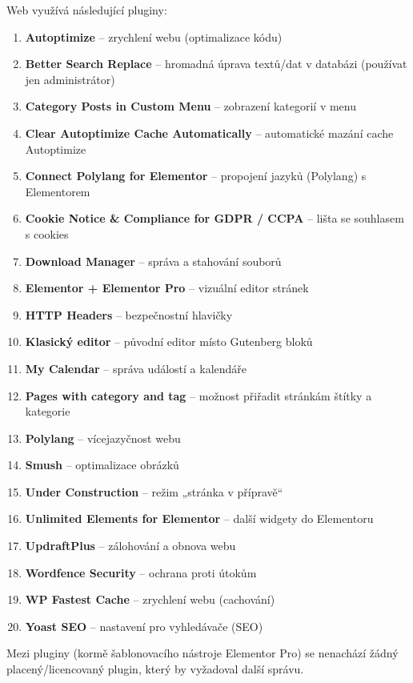 \documentclass[12pt,a4paper]{article}
\begin{document}
	Web využívá následující pluginy:
	\begin{enumerate}
		\item \textbf{Autoptimize} – zrychlení webu (optimalizace kódu)
		\item \textbf{Better Search Replace} – hromadná úprava textů/dat v databázi (používat jen administrátor)
		\item \textbf{Category Posts in Custom Menu} – zobrazení kategorií v menu
		\item \textbf{Clear Autoptimize Cache Automatically} – automatické mazání cache Autoptimize
		\item \textbf{Connect Polylang for Elementor} – propojení jazyků (Polylang) s Elementorem
		\item \textbf{Cookie Notice \& Compliance for GDPR / CCPA} – lišta se souhlasem s cookies
		\item \textbf{Download Manager} – správa a stahování souborů
		\item \textbf{Elementor + Elementor Pro} – vizuální editor stránek
		\item \textbf{HTTP Headers} – bezpečnostní hlavičky
		\item \textbf{Klasický editor} – původní editor místo Gutenberg bloků
		\item \textbf{My Calendar} – správa událostí a kalendáře
		\item \textbf{Pages with category and tag} – možnost přiřadit stránkám štítky a kategorie
		\item \textbf{Polylang} – vícejazyčnost webu
		\item \textbf{Smush} – optimalizace obrázků
		\item \textbf{Under Construction} – režim „stránka v přípravě“
		\item \textbf{Unlimited Elements for Elementor} – další widgety do Elementoru
		\item \textbf{UpdraftPlus} – zálohování a obnova webu
		\item \textbf{Wordfence Security} – ochrana proti útokům
		\item \textbf{WP Fastest Cache} – zrychlení webu (cachování)
		\item \textbf{Yoast SEO} – nastavení pro vyhledávače (SEO)
	\end{enumerate}
	
	Mezi pluginy (kormě šablonovacího nástroje Elementor Pro) se nenachází žádný placený/licencovaný plugin, který by vyžadoval další správu.
	
	
	
	
	
	
	
	
	
\end{document}
